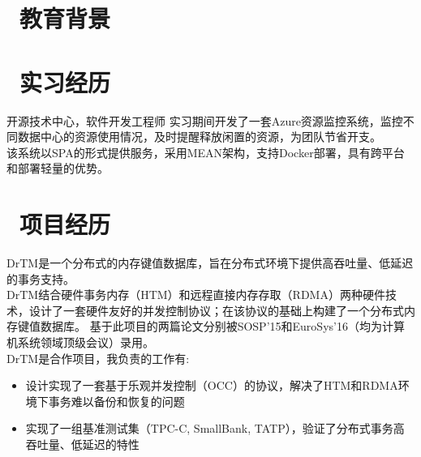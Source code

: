\documentclass{resume}
\begin{document}


 
\section{\faGraduationCap\ 教育背景}

\section{\faBriefcase\ 实习经历}
 {开源技术中心，软件开发工程师}
实习期间开发了一套Azure资源监控系统，监控不同数据中心的资源使用情况，及时提醒释放闲置的资源，为团队节省开支。
\\[5pt]
该系统以SPA的形式提供服务，采用MEAN架构，支持Docker部署，具有跨平台和部署轻量的优势。

\section{\faUsers\ 项目经历}
DrTM是一个分布式的内存键值数据库，旨在分布式环境下提供高吞吐量、低延迟的事务支持。
\\[5pt]
DrTM结合硬件事务内存（HTM）和远程直接内存存取（RDMA）两种硬件技术，设计了一套硬件友好的并发控制协议；在该协议的基础上构建了一个分布式内存键值数据库。
基于此项目的两篇论文分别被SOSP’15和EuroSys’16（均为计算机系统领域顶级会议）录用。
\\[5pt]
DrTM是合作项目，我负责的工作有:
\begin{itemize}[parsep=0.5ex]
  \item 设计实现了一套基于乐观并发控制（OCC）的协议，解决了HTM和RDMA环境下事务难以备份和恢复的问题
  \item 实现了一组基准测试集（TPC-C, SmallBank, TATP），验证了分布式事务高吞吐量、低延迟的特性
\end{itemize}
\end{document}
